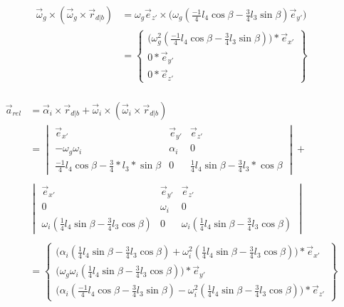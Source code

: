 \documentclass[a4paper,10pt]{article}
\begin{document}
\begin{equation}
	\begin{aligned}
	\vec{\omega}_g \times (\vec{\omega}_g \times \vec{r}_{d|b}) &= \omega_g \vec{e}_{z'} \times \Big(\omega_g (\frac{-1}{4} l_4 \cos{\beta}-\frac{3}{4} l_3 \sin{\beta})\vec{e}_{y'}\Big)\\
	& = \begin{Bmatrix}
	\Big(\omega_{g}^{2} (\frac{-1}{4} l_4 \cos{\beta}-\frac{3}{4} l_3 \sin{\beta})\Big) * \vec{e}_{x'}\\
	0*\vec{e}_{y'}\\
	0*\vec{e}_{z'}
	\end{Bmatrix}
	\end{aligned}
\end{equation}\\
\begin{equation}
	\begin{aligned}
	\vec{a}_{rel} &= \vec{\alpha}_i \times \vec{r}_{d|b} + \vec{\omega}_i \times(\vec{\omega}_i \times \vec{r}_{d|b})\\
	&= \begin{vmatrix}
	\vec{e}_{x'} & \vec{e}_{y'} & \vec{e}_{z'}\\
	-\omega_g\omega_i & \alpha_i & 0 \\
	\frac{-1}{4} l_4 \cos{\beta} - \frac{3}{4}*l_3 * \sin{\beta} & 0 &\frac{1}{4} l_4 \sin{\beta}-\frac{3}{4} l_3 * \cos{\beta}
	\end{vmatrix} + \\
	\\
	&\begin{vmatrix}
	\vec{e}_{x'} & \vec{e}_{y'} & \vec{e}_{z'}\\
	0 & \omega_i & 0 \\
	\omega_i (\frac{1}{4} l_4 \sin{\beta}-\frac{3}{4} l_3  \cos{\beta}) & 0 &\omega_i (\frac{1}{4} l_4  \sin{\beta}-\frac{3}{4} l_3   \cos{\beta})
	\end{vmatrix}\\
	\\
	&= \begin{Bmatrix}
	\Big(\alpha_i(\frac{1}{4} l_4  \sin{\beta}-\frac{3}{4} l_3  \cos{\beta}) + \omega_i^2 (\frac{1}{4} l_4  \sin{\beta}-\frac{3}{4} l_3  \cos{\beta})\Big)*\vec{e}_{x'}\\
	\Big(\omega_g\omega_i(\frac{1}{4} l_4  \sin{\beta}-\frac{3}{4} l_3  \cos{\beta})\Big)*\vec{e}_{y'}\\
	\Big(\alpha_i (\frac{-1}{4} l_4 \cos{\beta} - \frac{3}{4} l_3 \sin{\beta}) - \omega_i^2(\frac{1}{4} l_4  \sin{\beta}-\frac{3}{4} l_3 \cos{\beta})\Big)*\vec{e}_{z'}
	\end{Bmatrix}
	\end{aligned}
\end{equation}
\end{document}
